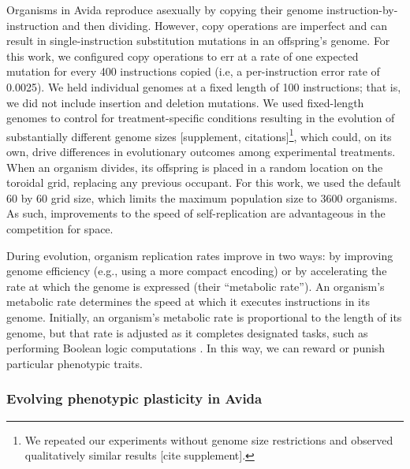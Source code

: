 Organisms in Avida reproduce asexually by copying their genome instruction-by-instruction and then dividing. 
However, copy operations are imperfect and can result in single-instruction substitution mutations in an offspring's genome. 
For this work, we configured copy operations to err at a rate of one expected mutation for every 400 instructions copied (i.e, a per-instruction error rate of 0.0025).
We held individual genomes at a fixed length of 100 instructions; that is, we did not include insertion and deletion mutations. 
We used fixed-length genomes to control for treatment-specific conditions resulting in the evolution of substantially different genome sizes [supplement, citations]\footnote{We repeated our experiments without genome size restrictions and observed qualitatively similar results [cite supplement].}, which could, on its own, drive differences in evolutionary outcomes among experimental treatments.
When an organism divides, its offspring is placed in a random location on the toroidal grid, replacing any previous occupant.
For this work, we used the default 60 by 60 grid size, which limits the maximum population size to 3600 organisms.
As such, improvements to the speed of self-replication are advantageous in the competition for space.


During evolution, organism replication rates improve in two ways: by improving genome efficiency (e.g., using a more compact encoding) or by accelerating the rate at which the genome is expressed (their ``metabolic rate'').
An organism's metabolic rate determines the speed at which it executes instructions in its genome.
Initially, an organism's metabolic rate is proportional to the length of its genome, but that rate is adjusted as it completes designated tasks, such as performing Boolean logic computations \citep{ofria_avida:_2009}.
In this way, we can reward or punish particular phenotypic traits. 

\vspace{1cm}
\subsubsection{Evolving phenotypic plasticity in Avida}
\label{sec:methods:evolution-of-plasticity-in-avida}

